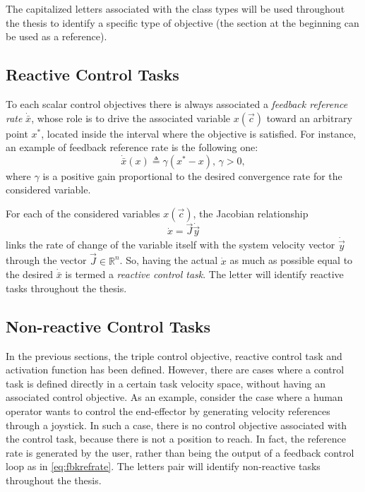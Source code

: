 The capitalized letters associated with the class types will be used throughout the thesis to identify a specific type of objective (the  section at the beginning can be used as a reference).

\subsection{Reactive Control Tasks}
To each scalar control objectives there is always associated a \emph{feedback reference rate} $\dot{\bar{x}}$, whose role is to drive the associated variable $x(\vec{c})$ toward an arbitrary point $x^*$, located inside the interval where the objective is satisfied. For instance, an example of feedback reference rate is the following one:
\begin{equation}\label{eq:fbkrefrate}
\dot{\bar{x}}(x) \triangleq \gamma (x^* - x),\,\gamma > 0,
\end{equation}
where $\gamma$ is a positive gain proportional to the desired convergence rate for the considered variable.

For each of the considered variables $x(\vec{c})$, the Jacobian relationship
\begin{equation}\label{eq:scalarjacrel}
\dot{x} = \vec{J} \dot{\vec{y}}
\end{equation}
links the rate of change of the variable itself with the system velocity vector $\dot{\vec{y}}$ through the vector $\vec{J} \in \mathbb{R}^n$. So, having the actual $\dot{x}$ as much as possible equal to the desired $\dot{\bar{x}}$ is termed a \emph{reactive control task}. The letter \bsq{\reactTask{}} will identify reactive tasks throughout the thesis.

\subsection{Non-reactive Control Tasks}
In the previous sections, the triple control objective, reactive control task and activation function has been defined. However, there are cases where a control task is defined directly in a certain task velocity space, without having an associated control objective. As an example, consider the case where a human operator wants to control the end-effector by generating velocity references through a joystick. In such a case, there is no control objective associated with the control task, because there is not a position to reach. In fact, the reference rate is generated by the user, rather than being the output of a feedback control loop as in \eqref{eq:fbkrefrate}.
The letters pair \bsq{\nonReactTask{}} will identify non-reactive tasks throughout the thesis.

